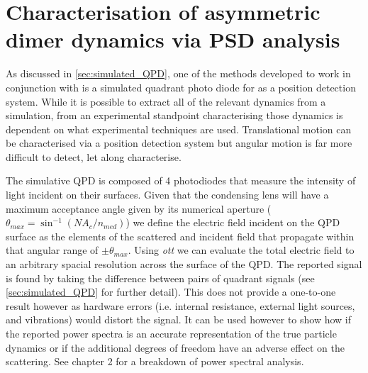 \section{Characterisation of asymmetric dimer dynamics via PSD analysis}
As discussed in \ref{sec:simulated_QPD}, one of the methods 
developed to work in conjunction with \cite{Vigilante2020} 
is a simulated quadrant photo diode for as a position 
detection system. While it is possible to extract all of 
the relevant dynamics from a simulation, from an experimental
standpoint characterising those dynamics is dependent on what
experimental techniques are used. Translational motion can be
characterised via a position detection system but angular 
motion is far more difficult to detect, let along characterise. 

The simulative QPD is composed of 4 photodiodes that measure the 
intensity of light incident on their surfaces. Given that the 
condensing lens will have a maximum acceptance angle given by 
its numerical aperture ($\theta_{max} = \sin^{-1}\left(NA_c/n_
{med}\right)$) we define the electric field incident on the QPD 
surface as the elements of the scattered and incident field that 
propagate within that angular range of $\pm \theta_{max}$. Using 
\textit{ott} we can evaluate the total electric field to an 
arbitrary spacial resolution across the surface of the QPD. The 
reported signal is found by taking the difference between pairs 
of quadrant signals (see \ref{sec:simulated_QPD} for further 
detail). This does not provide a one-to-one result however as 
hardware errors (i.e. internal resistance, external light sources, 
and vibrations) would distort the signal. It can be used however to 
show how if the reported power spectra is an accurate representation 
of the true particle dynamics or if the additional degrees of freedom 
have an adverse effect on the scattering. See chapter 2 for a breakdown
of power spectral analysis. 

